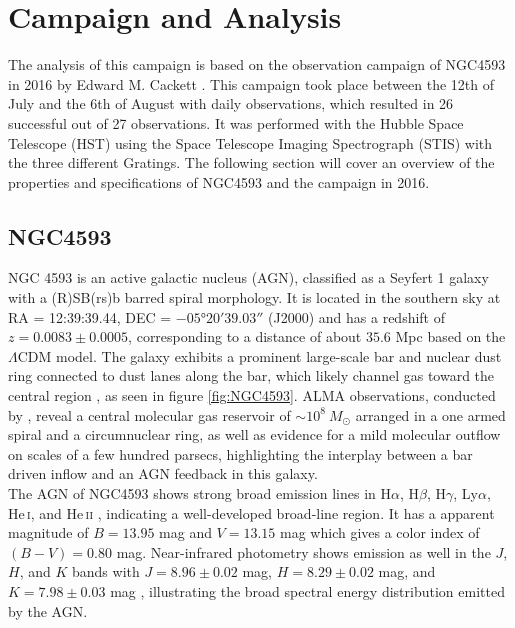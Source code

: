 \chapter{Campaign and Analysis}
\label{campaign_and_analysis}
The analysis of this campaign is based on the observation campaign of NGC4593 in 2016 by Edward M. Cackett \parencite{cackett2018accretion}. This campaign took place between the 12th of July and the 6th of August with daily observations, which resulted in 26 successful out of 27 observations. It was performed with the Hubble Space Telescope (HST) using the Space Telescope Imaging Spectrograph (STIS) with the three different Gratings. The following section will cover an overview of the properties and specifications of NGC4593 and the campaign in 2016.

\section{NGC4593}
\label{NGC4593}

NGC 4593 is an active galactic nucleus (AGN), classified as a Seyfert 1 galaxy with a \mbox{(R)SB(rs)b} barred spiral morphology. 
It is located in the southern sky at RA = 12:39:39.44, DEC = $-05$°$ 20' 39.03''$ (J2000) and has a redshift of $z = 0.0083 \pm 0.0005$, corresponding to a distance of about $35.6$ Mpc \parencite{simbaNGC4593} based on the $\Lambda$CDM model. 
The galaxy exhibits a prominent large-scale bar and nuclear dust ring connected to dust lanes along the bar, which likely channel gas toward the central region \parencite{mulchaey1997structure}, as seen in figure \ref{fig:NGC4593}. ALMA observations, conducted by \parencite{garcia2019alma}, reveal a central molecular gas reservoir of $\sim 10^8 \ M_\odot$ arranged in a one armed spiral and a circumnuclear ring, as well as evidence for a mild molecular outflow on scales of a few hundred parsecs, highlighting the interplay between a bar driven inflow and an AGN feedback in this galaxy.\\
The AGN of NGC4593 shows strong broad emission lines in  H$\alpha$,  H$\beta$,  H$\gamma$, Ly$\alpha$, He\,\textsc{i}, and He\,\textsc{ii} \parencite{bentz2015agn}, indicating a well-developed broad-line region. It has a apparent magnitude of $B = 13.95$ mag and $V = 13.15$ mag \parencite{veron2010catalogue} which gives a color index of $(B - V)=0.80$ mag. Near-infrared photometry shows emission as well in the $J$, $H$, and $K$ bands with $J = 8.96 \pm 0.02$ mag, $H = 8.29 \pm 0.02$ mag, and $K = 7.98 \pm 0.03$ mag \parencite{Skrutskie2006}, illustrating the broad spectral energy distribution emitted by the AGN.

